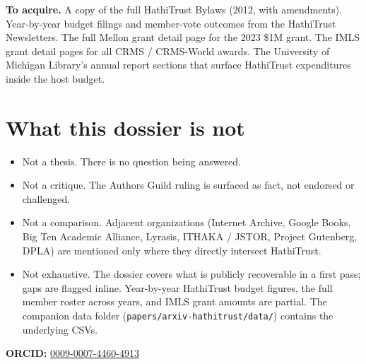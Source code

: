 \documentclass[10pt,letterpaper,twocolumn]{article}
\begin{document}
\textbf{To acquire.} A copy of the full HathiTrust Bylaws (2012, with amendments). Year-by-year budget filings and member-vote outcomes from the HathiTrust Newsletters. The full Mellon grant detail page for the 2023 \$1M grant. The IMLS grant detail pages for all CRMS / CRMS-World awards. The University of Michigan Library's annual report sections that surface HathiTrust expenditures inside the host budget.

\section{What this dossier is not}

\begin{itemize}
  \item Not a thesis. There is no question being answered.
  \item Not a critique. The Authors Guild ruling is surfaced as fact, not endorsed or challenged.
  \item Not a comparison. Adjacent organizations (Internet Archive, Google Books, Big Ten Academic Alliance, Lyrasis, ITHAKA / JSTOR, Project Gutenberg, DPLA) are mentioned only where they directly intersect HathiTrust.
  \item Not exhaustive. The dossier covers what is publicly recoverable in a first pass; gaps are flagged inline. Year-by-year HathiTrust budget figures, the full member roster across years, and IMLS grant amounts are partial. The companion data folder (\texttt{papers/arxiv-hathitrust/data/}) contains the underlying CSVs.
\end{itemize}

\vspace{0.5em}
\noindent\textbf{ORCID:} \href{https://orcid.org/0009-0007-4460-4913}{0009-0007-4460-4913}



\end{document}
